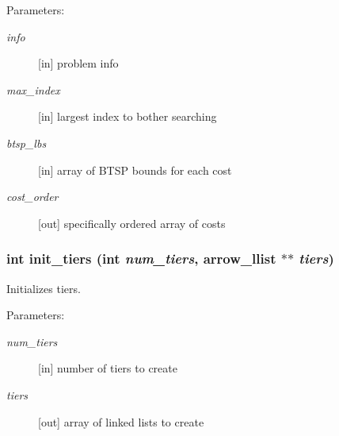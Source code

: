 \begin{Desc}
\item[Parameters:]
\begin{description}
\item[{\em info}]\mbox{[}in\mbox{]} problem info \item[{\em max\_\-index}]\mbox{[}in\mbox{]} largest index to bother searching \item[{\em btsp\_\-lbs}]\mbox{[}in\mbox{]} array of BTSP bounds for each cost \item[{\em cost\_\-order}]\mbox{[}out\mbox{]} specifically ordered array of costs \end{description}
\end{Desc}
\hypertarget{lib_2baltsp_2baltsp-ib2_8c_05a2ff158dd6edc613a6623787c04a31}{
\subsubsection[{init\_\-tiers}]{\setlength{\rightskip}{0pt plus 5cm}int init\_\-tiers (int {\em num\_\-tiers}, \/  {\bf arrow\_\-llist} $\ast$$\ast$ {\em tiers})}}
\label{lib_2baltsp_2baltsp-ib2_8c_05a2ff158dd6edc613a6623787c04a31}


Initializes tiers. 

\begin{Desc}
\item[Parameters:]
\begin{description}
\item[{\em num\_\-tiers}]\mbox{[}in\mbox{]} number of tiers to create \item[{\em tiers}]\mbox{[}out\mbox{]} array of linked lists to create \end{description}
\end{Desc}
